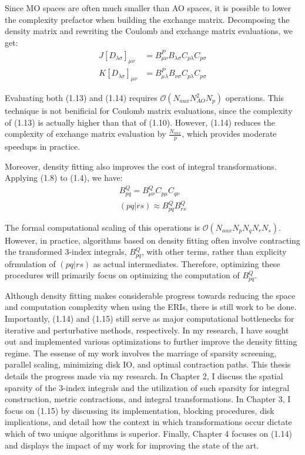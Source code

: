 \noindent Since MO spaces are often much smaller than AO spaces, it is possible to lower the complexity prefactor when 
building the exchange matrix.  
Decomposing the density matrix and rewriting the Coulomb and exchange matrix evaluations, we get:
\begin{align}
J[D_{\lambda \sigma}]_{\mu \nu} &= B_{\mu \nu}^P B_{\lambda \sigma}C_{p\lambda}C_{p\sigma} \\
K[D_{\lambda \sigma}]_{\mu \nu} &= B_{\mu \lambda}^P B_{\nu \sigma}C_{p\lambda}C_{p\sigma}
\end{align}

\noindent Evaluating both (1.13) and (1.14) requires $\mathcal{O}(N_{aux}N_{AO}^2N_p)$ operations.
This technique is not benificial for Coulomb matrix evaluations, since the complexity of (1.13) is actually
higher than that of (1.10). However, (1.14) reduces the complexity of exchange matrix evaluation by  
$\frac{N_{aux}}{p}$, which provides moderate speedups in practice.

Moreover, density fitting also improves the cost of integral transformations. Applying (1.8) to (1.4), we have:
\begin{align}
B^Q_{pq} = B^Q_{\mu \nu}C_{p \mu}C_{q \nu} \\
(pq | rs) \approx B^Q_{pq}B^Q_{rs}
\end{align}

The formal computational scaling of this operations is $\mathcal{O}(N_{aux}N_pN_qN_rN_s)$.  However, in practice,
algorithms based on density fitting often involve contracting the transformed 3-index integrals, $B^Q_{pq}$, with other terms, 
rather than explicity ofrmulation of $(pq|rs)$ as actual intermediates. Therefore, optimizing these procedures will primarily
focus on optimizing the computation of $B^Q_{pq}$. 

Although density fitting makes considerable progress towards reducing the space and computation complexity when
using the ERIs, there is still work to be done. Importantly, (1.14) and (1.15) still serve as major computational
bottlenecks for iterative and perturbative methods, respectively. In my research, I have sought out and implemented various 
optimizations to further improve the density fitting regime. The essense of my work involves the marriage of sparsity screening,
parallel scaling, minimizing disk IO, and optimal contraction paths. This thesis details the progress made via my research.
In Chapter 2, I discuss the spatial sparsity of the 3-index integrals and the utilization of such sparsity for integral 
construction, metric contractions, and integral transformations.
In Chapter 3, I focus on (1.15) by discussing its implementation, blocking procedures, disk implications,
and detail how the context in which transformations occur dictate which of two unique algorithms is superior.
Finally, Chapter 4 focuses on (1.14) and displays the impact of my work for improving the state of the art. 



